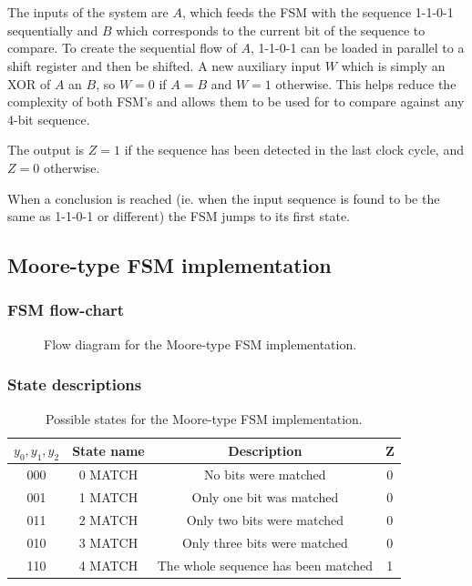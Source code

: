 \documentclass[../../e3_tp3_main.tex]{subfiles}
\begin{document}
\chapter{}



The inputs of the system are $A$, which feeds the FSM with the sequence 1-1-0-1 sequentially and $B$ which corresponds to the current bit of the sequence to compare. To create the sequential flow of $A$, 1-1-0-1 can be loaded in parallel to a shift register and then be shifted. A new auxiliary input $W$ which is simply an XOR of $A$ an $B$, so $W=0$ if $A=B$ and $W=1$ otherwise. This helps reduce the complexity of both FSM's and allows them to be used for to compare against any 4-bit sequence.

The output is $Z=1$ if the sequence has been detected in the last clock cycle, and $Z=0$ otherwise.

When a conclusion is reached (ie. when the input sequence is found to be the same as 1-1-0-1 or different) the FSM jumps to its first state.

\section{Moore-type FSM implementation}
\subsection{FSM flow-chart}

\begin{figure}[H]
	\centering
	
	\caption{Flow diagram for the Moore-type FSM implementation.}
\end{figure}
\subsection{State descriptions}
\begin{table}[H]	%
	\centering
		\begin{tabular}{|c|c|c|c|}
		\hline 
		$y_0,y_1,y_2$ & State name & Description & Z \\ 
		\hline 
		000 & 0 MATCH & No bits were matched & 0\\ 
		\hline 
		001 & 1 MATCH & Only one bit was matched & 0\\ 
		\hline 
		011 & 2 MATCH & Only two bits were matched & 0\\ 
		\hline 
		010 & 3 MATCH & Only three bits were matched & 0\\ 
		\hline 
		110 & 4 MATCH & The whole sequence has been matched & 1\\ 
		\hline 
		\end{tabular} 
	\caption{Possible states for the Moore-type FSM implementation.}
	\label{tab:ej2_moore_states}
\end{table}
\end{document}
